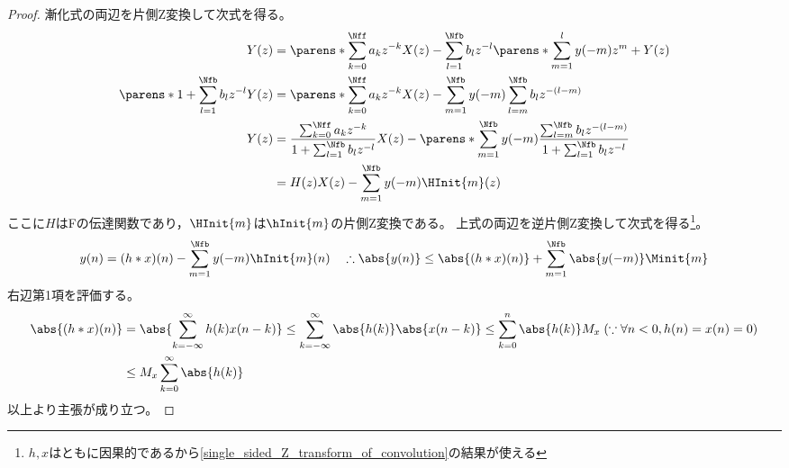     \begin{proof}
        漸化式の両辺を片側Z変換して次式を得る。
        \begin{align*}
            Y(z) &= \parens*{\sum_{k=0}^\Nff a_k z^{-k}}X(z) - \sum_{l=1}^\Nfb b_l z^{-l}\parens*{\sum_{m=1}^l y(-m)z^m + Y(z)} \\
            \parens*{1+\sum_{l=1}^\Nfb b_l z^{-l}}Y(z) &= \parens*{\sum_{k=0}^\Nff a_k z^{-k}}X(z) - \sum_{m=1}^\Nfb y(-m) \sum_{l=m}^\Nfb b_l z^{-(l-m)} \\
            Y(z) &= \frac{\sum_{k=0}^\Nff a_k z^{-k}}{1+\sum_{l=1}^\Nfb b_l z^{-l}}X(z) - \parens*{\sum_{m=1}^\Nfb y(-m)}\frac{\sum_{l=m}^\Nfb b_l z^{-(l-m)}}{1+\sum_{l=1}^\Nfb b_l z^{-l}} \\
            &= H(z)X(z) - \sum_{m=1}^\Nfb y(-m) \HInit{m}(z)
        \end{align*}
        ここに$H$はFの伝達関数であり，$\HInit{m}$は$\hInit{m}$の片側Z変換である。
        上式の両辺を逆片側Z変換して次式を得る\footnote{$h,x$はともに因果的であるから\ref{single_sided_Z_transform_of_convolution}の結果が使える}。
        \[ y(n) = (h*x)(n) - \sum_{m=1}^\Nfb y(-m) \hInit{m}(n) \quad \therefore\abs{y(n)} \leq \abs{(h*x)(n)} + \sum_{m=1}^\Nfb \abs{y(-m)} \Minit{m} \]
        右辺第1項を評価する。
        \begin{align*}
            \abs{(h*x)(n)} &= \abs{\sum_{k=-\infty}^\infty h(k)x(n-k)} \leq \sum_{k=-\infty}^\infty \abs{h(k)}\abs{x(n-k)} \leq \sum_{k=0}^n \abs{h(k)}M_x\;(\because \forall n<0, h(n)=x(n)=0) \\
            &\leq M_x\sum_{k=0}^\infty \abs{h(k)}
        \end{align*}
        以上より主張が成り立つ。
    \end{proof}